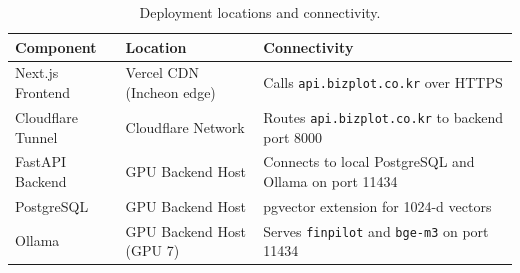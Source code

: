 \documentclass[11pt, a4paper]{article}
\begin{document}
\begin{table}[H]
\centering
\caption{Deployment locations and connectivity.}
\label{tab:deploy}
\renewcommand{\arraystretch}{1.35}
\begin{tabularx}{\textwidth}{M{2.8cm} M{2.6cm} L}
\toprule
\textbf{Component} & \textbf{Location} & \textbf{Connectivity} \\
\midrule
Next.js Frontend   & Vercel CDN (Incheon edge)
                   & Calls \texttt{api.bizplot.co.kr} over HTTPS \\
Cloudflare Tunnel  & Cloudflare Network
                   & Routes \texttt{api.bizplot.co.kr} to
                     backend port 8000 \\
FastAPI Backend    & GPU Backend Host
                   & Connects to local PostgreSQL and Ollama on port 11434 \\
PostgreSQL         & GPU Backend Host
                   & pgvector extension for 1024-d vectors \\
Ollama             & GPU Backend Host (GPU 7)
                   & Serves \texttt{finpilot} and \texttt{bge-m3}
                     on port 11434 \\
\bottomrule
\end{tabularx}
\end{table}
\end{document}
